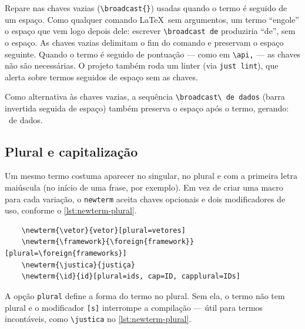 Repare nas chaves vazias (\texttt{\textbackslash{}broadcast\{\}}) usadas quando o termo é seguido de um espaço. Como qualquer comando \LaTeX\ sem argumentos, um termo \enquote{engole} o espaço que vem logo depois dele: escrever \texttt{\textbackslash{}broadcast de} produziria \enquote{\broadcast de}, sem o espaço. As chaves vazias delimitam o fim do comando e preservam o espaço seguinte. Quando o termo é seguido de pontuação --- como em \texttt{\textbackslash{}api,} --- as chaves não são necessárias. O projeto também roda um linter (via \texttt{just lint}), que alerta sobre termos seguidos de espaço sem as chaves. %

Como alternativa às chaves vazias, a sequência \texttt{\textbackslash{}broadcast\textbackslash{} de dados} (barra invertida seguida de espaço) também preserva o espaço após o termo, gerando: \broadcast\ de dados.

\subsection{Plural e capitalização}

Um mesmo termo costuma aparecer no singular, no plural e com a primeira letra maiúscula (no início de uma frase, por exemplo). Em vez de criar uma macro para cada variação, o \texttt{newterm} aceita chaves opcionais e dois modificadores de uso, conforme o \autoref{lst:newterm-plural}.

\begin{listing}[htb]
  \begin{verbatim}
    \newterm{\vetor}{vetor}[plural=vetores]
    \newterm{\framework}{\foreign{framework}}[plural=\foreign{frameworks}]
    \newterm{\justica}{justiça}
    \newterm{\id}{id}[plural=ids, cap=ID, capplural=IDs]
  \end{verbatim}
  \caption{Definição de termos com plural e capitalização}
  \label{lst:newterm-plural}
\end{listing}

A opção \texttt{plural} define a forma do termo no plural. Sem ela, o termo não tem plural e o modificador \texttt{[s]} interrompe a compilação --- útil para termos incontáveis, como \texttt{\textbackslash{}justica} no \autoref{lst:newterm-plural}.

